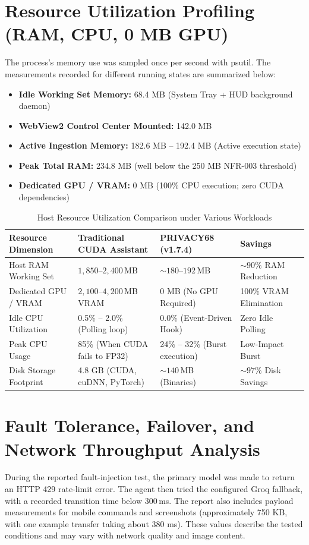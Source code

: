 \documentclass[12pt,letterpaper,oneside]{report}
\begin{document}
\section{Resource Utilization Profiling (RAM, CPU, 0 MB GPU)}
The process's memory use was sampled once per second with psutil. The measurements recorded for different running states are summarized below:
\begin{itemize}
    \item \textbf{Idle Working Set Memory:} 68.4 MB (System Tray + HUD background daemon)
    \item \textbf{WebView2 Control Center Mounted:} 142.0 MB
    \item \textbf{Active Ingestion Memory:} 182.6 MB – 192.4 MB (Active execution state)
    \item \textbf{Peak Total RAM:} 234.8 MB (well below the 250 MB NFR-003 threshold)
    \item \textbf{Dedicated GPU / VRAM:} 0 MB (100\% CPU execution; zero CUDA dependencies)
\end{itemize}

\begin{table}[H]
\centering
\caption{Host Resource Utilization Comparison under Various Workloads}
\label{tab:resource_utilization}
\begin{tabularx}{\textwidth}{|l|X|X|l|}
\hline
\textbf{Resource Dimension} & \textbf{Traditional CUDA Assistant} & \textbf{PRIVACY68 (v1.7.4)} & \textbf{Savings}\\ \hline
Host RAM Working Set & $1{,}850$--$2{,}400$\,MB & $\sim 180$--$192$\,MB & $\sim 90\%$ RAM Reduction\\ \hline
Dedicated GPU / VRAM & $2{,}100$--$4{,}200$\,MB VRAM & 0 MB (No GPU Required) & 100\% VRAM Elimination\\ \hline
Idle CPU Utilization & 0.5\% – 2.0\% (Polling loop) & 0.0\% (Event-Driven Hook) & Zero Idle Polling\\ \hline
Peak CPU Usage & 85\% (When CUDA fails to FP32) & 24\% – 32\% (Burst execution) & Low-Impact Burst\\ \hline
Disk Storage Footprint & 4.8 GB (CUDA, cuDNN, PyTorch) & $\sim 140$\,MB (Binaries) & $\sim 97\%$ Disk Savings\\ \hline
\end{tabularx}
\end{table}

\section{Fault Tolerance, Failover, and Network Throughput Analysis}
During the reported fault-injection test, the primary model was made to return an HTTP 429 rate-limit error. The agent then tried the configured Groq fallback, with a recorded transition time below 300\,ms. The report also includes payload measurements for mobile commands and screenshots (approximately 750 KB, with one example transfer taking about 380 ms). These values describe the tested conditions and may vary with network quality and image content.
\end{document}
